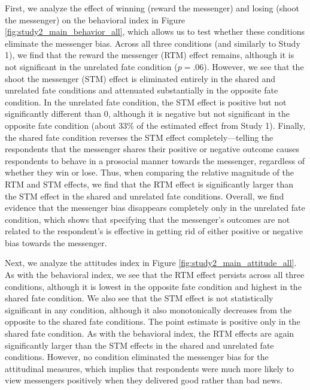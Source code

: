 

First, we analyze the effect of winning (reward the messenger) and
losing (shoot the messenger) on the behavioral index in Figure \ref{fig:study2_main_behavior_all}, which allows us to
test whether these conditions eliminate the messenger bias. Across all
three conditions (and similarly to Study 1), we find that the
reward the messenger (RTM) effect remains, although it is not
significant in the unrelated fate condition ($p = .06$). However, we
see that the shoot the messenger (STM) effect is eliminated entirely in
the shared and unrelated fate conditions and attenuated substantially in
the opposite fate condition. In the unrelated fate condition, the STM
effect is positive but not significantly different than 0, although it
is negative but not significant in the opposite fate condition (about
33\% of the estimated effect from Study 1). Finally, the shared
fate condition reverses the STM effect completely---telling the
respondents that the messenger shares their positive or negative outcome
causes respondents to behave in a prosocial manner towards the
messenger, regardless of whether they win or lose. Thus, when comparing
the relative magnitude of the RTM and STM effects, we find that the RTM
effect is significantly larger than the STM effect in the shared and unrelated fate conditions.
Overall, we find evidence that the messenger bias disappears completely
only in the unrelated fate condition, which shows that specifying that
the messenger's outcomes are not related to the respondent's is
effective in getting rid of either positive or negative bias towards the
messenger.



Next, we analyze the attitudes index in Figure \ref{fig:study2_main_attitude_all}. As with the behavioral index, we
see that the RTM effect persists across all three conditions, although
it is lowest in the opposite fate condition and highest in the shared
fate condition. We also see that the STM effect is not statistically
significant in any condition, although it also monotonically decreases
from the opposite to the shared fate conditions. The point estimate is
positive only in the shared fate condition. As with the behavioral
index, the RTM effects are again significantly larger than the STM
effects in the shared and unrelated fate conditions. However, no condition eliminated the
messenger bias for the attitudinal measures, which implies that
respondents were much more likely to view messengers positively when
they delivered good rather than bad news.

